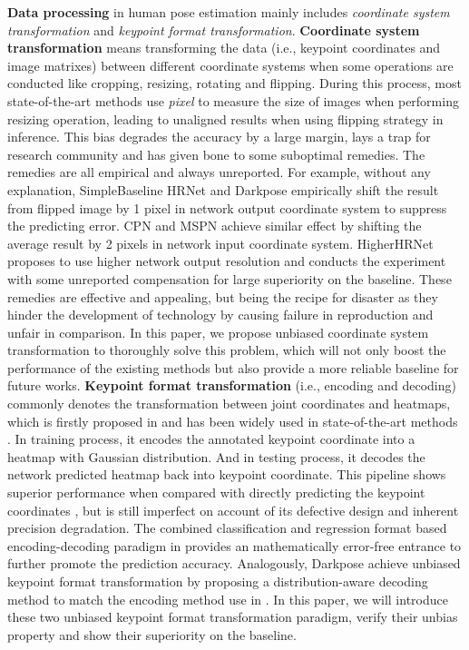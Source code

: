 \documentclass[10pt,journal,compsoc]{IEEEtran}
\begin{document}
\textbf{Data processing} in human pose estimation mainly includes \textit{coordinate system transformation} and \textit{keypoint format transformation}. \textbf{Coordinate system transformation} means transforming the data (i.e., keypoint coordinates and image matrixes) between different coordinate systems when some operations are conducted like cropping, resizing, rotating and flipping. During this process, most state-of-the-art methods \cite{CPN,SBNet,MSPN,HRNet,Higher} use \textit{pixel} to measure the size of images when performing resizing operation, leading to unaligned results when using flipping strategy in inference. This bias degrades the accuracy by a large margin, lays a trap for research community and has given bone to some suboptimal remedies. The remedies are all empirical and always unreported. For example, without any explanation, SimpleBaseline \cite{SBNet} HRNet \cite{HRNet} and Darkpose \cite{DARK} empirically shift the result from flipped image by 1 pixel in network output coordinate system to suppress the predicting error. CPN \cite{CPN} and MSPN \cite{MSPN} achieve similar effect by shifting the average result by 2 pixels in network input coordinate system. HigherHRNet \cite{Higher} proposes to use higher network output resolution and conducts the experiment with some unreported compensation for large superiority on the baseline. These remedies are effective and appealing, but being the recipe for disaster as they hinder the development of technology by causing failure in reproduction and unfair in comparison. In this paper, we propose unbiased coordinate system transformation to thoroughly solve this problem, which will not only boost the performance of the existing methods but also provide a more reliable baseline for future works. \textbf{Keypoint format transformation} (i.e., encoding and decoding) commonly denotes the transformation between joint coordinates and heatmaps, which is firstly proposed in \cite{tompson2014joint} and has been widely used in state-of-the-art methods \cite{Mask-RCNN,Higher,CPN,SBNet,MSPN,HRNet}. In training process, it encodes the annotated keypoint coordinate into a heatmap with Gaussian distribution. And in testing process, it decodes the network predicted heatmap back into keypoint coordinate. This pipeline shows superior performance when compared with directly predicting the keypoint coordinates \cite{sun2018integral}, but is still imperfect on account of its defective design and inherent precision degradation. The combined classification and regression format based encoding-decoding paradigm in \cite{G-RMI} provides an mathematically error-free entrance to further promote the prediction accuracy. Analogously, Darkpose \cite{DARK} achieve unbiased keypoint format transformation by proposing a distribution-aware decoding method to match the encoding method use in \cite{Higher}. In this paper, we will introduce these two unbiased keypoint format transformation paradigm, verify their unbias property and show their superiority on the baseline.
\end{document}
